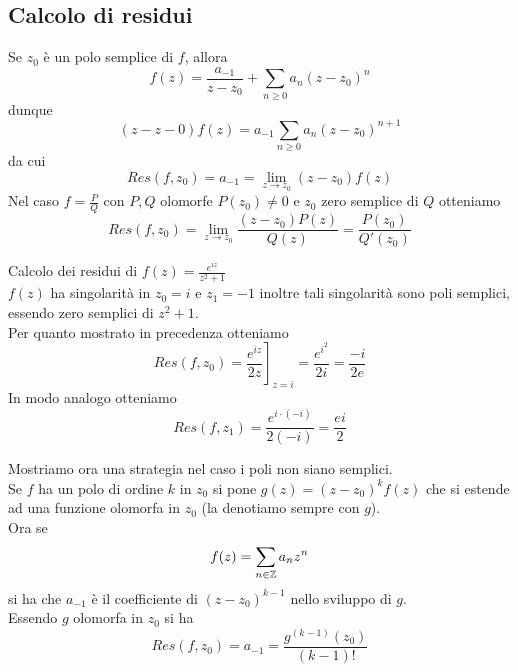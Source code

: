 \subsection{Calcolo di residui}
Se $z_0$ \`e un polo semplice di $f$, allora
$$ f(z) = \frac{a_{-1}}{z-z_0}+\sum_{n\geq 0} a_n (z-z_0)^n$$
dunque $$(z-z-0)f(z) = a_{-1} \sum_{n \geq 0 } a_n(z-z_0)^{n+1} $$ da cui 
$$Res(f,z_0) = a_{-1}=\lim_{z\to z_0} (z-z_0) f(z)$$
Nel caso $f=\frac{P}{Q}$ con $P,Q$ olomorfe $P(z_0)\neq 0 $ e $z_0$ zero semplice di $Q$ otteniamo 
$$ Res(f,z_0) = \lim_{z\to z_0} \frac{(z-z_0)P(z)}{Q(z)} =\frac{P(z_0)}{Q'(z_0)}$$
\begin{ese}Calcolo dei residui di $f(z) = \frac{e^{iz}}{z^2 +1}$\\
$f(z)$ ha singolarit\`a in $z_0=i$ e $z_1=-1$ inoltre tali singolarit\`a sono poli semplici, essendo zero semplici di $z^2+1$.\\
Per quanto mostrato in precedenza otteniamo 
$$ Res(f,z_0) = \left. \frac{e^{iz}}{2z}\right]_{z=i} = \frac{e^{i^2}}{2i} =\frac{-i}{2e}$$
In modo analogo otteniamo 
$$ Res(f,z_1) = \frac{e^{i\cdot (-i)}}{2(-i)} = \frac{ei}{2}$$
\end{ese}
Mostriamo ora una strategia nel caso i poli non siano semplici.\\
Se $f$ ha un polo di ordine $k$ in $z_0$ si pone $g(z)=(z-z_0)^k f(z)$ che si estende ad una funzione olomorfa in $z_0$ (la denotiamo sempre con $g$).\\
Ora se 
$$f(z) = \sum_{n \in \mathbb{Z}} a_n z^n $$ 
si ha che $a_{-1}$ \`e il coefficiente di $(z-z_0)^{k-1} $ nello sviluppo di $g$.\\
Essendo $g$ olomorfa in $z_0$ si ha 
$$Res(f,z_0) = a_{-1}=\frac{g^{(k-1)}(z_0)}{(k-1)!}$$
